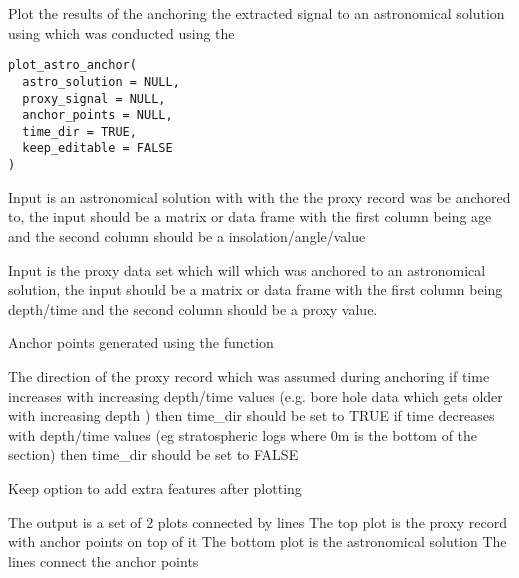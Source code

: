 \documentclass[a4paper]{book}
\begin{document}
%
\begin{Description}
Plot the results of the anchoring  the extracted signal to an astronomical solution using
which was conducted using the 
\end{Description}
%
\begin{Usage}
\begin{verbatim}
plot_astro_anchor(
  astro_solution = NULL,
  proxy_signal = NULL,
  anchor_points = NULL,
  time_dir = TRUE,
  keep_editable = FALSE
)
\end{verbatim}
\end{Usage}
%
\begin{Arguments}
\begin{ldescription}
\item[\code{astro\_solution}] Input is an astronomical solution with with the the proxy record was be anchored to,
the input should be a matrix or data frame with the first column being
age and the second column should be a insolation/angle/value

\item[\code{proxy\_signal}] Input is the proxy data set which will which was
anchored to an astronomical solution, the input should be a matrix or
data frame with the first column being  depth/time and the second column should be a proxy value.

\item[\code{anchor\_points}] Anchor points generated using the  function

\item[\code{time\_dir}] The direction of the proxy record which was assumed during anchoring if time increases with increasing depth/time values
(e.g. bore hole data which gets older with increasing depth ) then time\_dir should be set to TRUE
if time decreases with depth/time values (eg stratospheric logs where 0m is the bottom of the section)
then time\_dir should be set to FALSE 

\item[\code{keep\_editable}] Keep option to add extra features after plotting  
\end{ldescription}
\end{Arguments}
%
\begin{Value}
The output is a set of 2 plots connected by lines
The top plot is the proxy record with anchor points on top of it
The bottom plot is the astronomical solution
The lines connect the anchor points
\end{Value}
\end{document}
